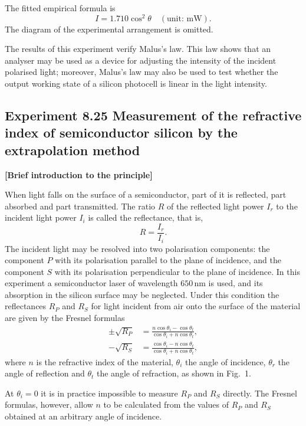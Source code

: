 The fitted empirical formula is
\[
I=1.710\cos^2\theta\quad(\text{unit: mW}).
\]
The diagram of the experimental arrangement is omitted.

\begin{commentary}
The results of this experiment verify Malus's law. This law shows that an analyser may be used as a device for adjusting the intensity of the incident polarised light; moreover, Malus's law may also be used to test whether the output working state of a silicon photocell is linear in the light intensity.
\end{commentary}

\subsection*{Experiment 8.25 \quad Measurement of the refractive index of semiconductor silicon by the extrapolation method}

\textbf{[Brief introduction to the principle]}

When light falls on the surface of a semiconductor, part of it is reflected, part absorbed and part transmitted. The ratio $R$ of the reflected light power $I_r$ to the incident light power $I_i$ is called the reflectance, that is,
\begin{equation}
R=\frac{I_r}{I_i}. \tag{1}
\end{equation}
The incident light may be resolved into two polarisation components: the component $P$ with its polarisation parallel to the plane of incidence, and the component $S$ with its polarisation perpendicular to the plane of incidence. In this experiment a semiconductor laser of wavelength $650\,\mathrm{nm}$ is used, and its absorption in the silicon surface may be neglected. Under this condition the reflectances $R_P$ and $R_S$ for light incident from air onto the surface of the material are given by the Fresnel formulas
\begin{align}
\pm\sqrt{R_P}&=\frac{n\cos\theta_i-\cos\theta_t}{\cos\theta_i+n\cos\theta_t}, \tag{2}\\
-\sqrt{R_S}&=\frac{\cos\theta_i-n\cos\theta_t}{\cos\theta_i+n\cos\theta_t}, \tag{3}
\end{align}
where $n$ is the refractive index of the material, $\theta_i$ the angle of incidence, $\theta_r$ the angle of reflection and $\theta_t$ the angle of refraction, as shown in Fig.~1.

At $\theta_i=0$ it is in practice impossible to measure $R_P$ and $R_S$ directly. The Fresnel formulas, however, allow $n$ to be calculated from the values of $R_P$ and $R_S$ obtained at an arbitrary angle of incidence.

